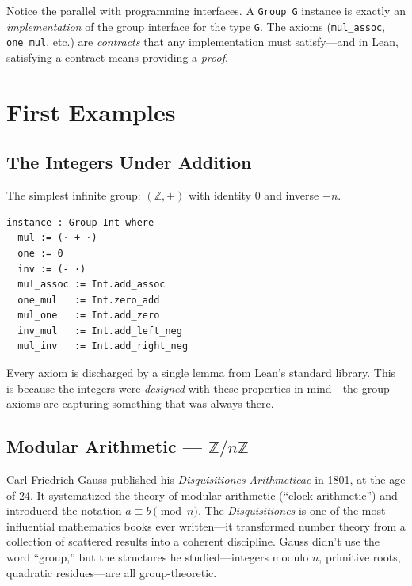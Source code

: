 \documentclass[11pt, a4paper, oneside]{book}
\newcommand{\Z}{\mathbb{Z}}
\newcommand{\lc}[1]{\texttt{#1}}
\begin{document}
\begin{intuition}
Notice the parallel with programming interfaces. A \lc{Group G} instance
is exactly an \emph{implementation} of the group interface for the type
\lc{G}. The axioms (\lc{mul\_assoc}, \lc{one\_mul}, etc.) are
\emph{contracts} that any implementation must satisfy---and in Lean, satisfying
a contract means providing a \emph{proof}.
\end{intuition}

\section{First Examples}

\subsection{The Integers Under Addition}

The simplest infinite group: $(\Z, +)$ with identity $0$ and inverse $-n$.

\begin{leanbox}
\begin{verbatim}
instance : Group Int where
  mul := (· + ·)
  one := 0
  inv := (- ·)
  mul_assoc := Int.add_assoc
  one_mul   := Int.zero_add
  mul_one   := Int.add_zero
  inv_mul   := Int.add_left_neg
  mul_inv   := Int.add_right_neg
\end{verbatim}
\end{leanbox}

Every axiom is discharged by a single lemma from Lean's standard library. This
is because the integers were \emph{designed} with these properties in mind---the
group axioms are capturing something that was always there.

\subsection{Modular Arithmetic --- $\Z/n\Z$}

\begin{historical}[title={Gauss and the \textit{Disquisitiones}}]
Carl Friedrich Gauss published his \textit{Disquisitiones Arithmeticae} in 1801,
at the age of 24. It systematized the theory of modular arithmetic (``clock
arithmetic'') and introduced the notation $a \equiv b \pmod{n}$. The
\textit{Disquisitiones} is one of the most influential mathematics books ever
written---it transformed number theory from a collection of scattered results
into a coherent discipline. Gauss didn't use the word ``group,'' but the
structures he studied---integers modulo $n$, primitive roots, quadratic
residues---are all group-theoretic.
\end{historical}
\end{document}
